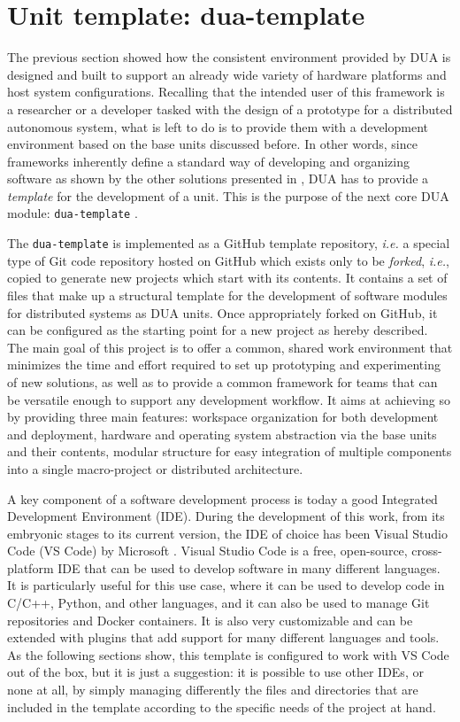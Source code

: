 \section{Unit template: dua-template}
\label{sec:dua_template}
The previous section showed how the consistent environment provided by DUA is designed and built to support an already wide variety of hardware platforms and host system configurations. Recalling that the intended user of this framework is a researcher or a developer tasked with the design of a prototype for a distributed autonomous system, what is left to do is to provide them with a development environment based on the base units discussed before. In other words, since frameworks inherently define a standard way of developing and organizing software as shown by the other solutions presented in , DUA has to provide a \emph{template} for the development of a unit. This is the purpose of the next core DUA module: \texttt{dua-template} \cite{masocco_dua-template_nodate}.

The \texttt{dua-template} is implemented as a GitHub template repository, \emph{i.e.} a special type of Git code repository hosted on GitHub \cite{github_github_nodate} which exists only to be \emph{forked}, \emph{i.e.}, copied to generate new projects which start with its contents. It contains a set of files that make up a structural template for the development of software modules for distributed systems as DUA units. Once appropriately forked on GitHub, it can be configured as the starting point for a new project as hereby described. The main goal of this project is to offer a common, shared work environment that minimizes the time and effort required to set up prototyping and experimenting of new solutions, as well as to provide a common framework for teams that can be versatile enough to support any development workflow. It aims at achieving so by providing three main features: workspace organization for both development and deployment, hardware and operating system abstraction via the base units and their contents, modular structure for easy integration of multiple components into a single macro-project or distributed architecture.

A key component of a software development process is today a good Integrated Development Environment (IDE). During the development of this work, from its embryonic stages to its current version, the IDE of choice has been Visual Studio Code (VS Code) by Microsoft \cite{microsoft_visual_nodate}. Visual Studio Code is a free, open-source, cross-platform IDE that can be used to develop software in many different languages. It is particularly useful for this use case, where it can be used to develop code in C/C++, Python, and other languages, and it can also be used to manage Git repositories and Docker containers. It is also very customizable and can be extended with plugins that add support for many different languages and tools. As the following sections show, this template is configured to work with VS Code out of the box, but it is just a suggestion: it is possible to use other IDEs, or none at all, by simply managing differently the files and directories that are included in the template according to the specific needs of the project at hand.


